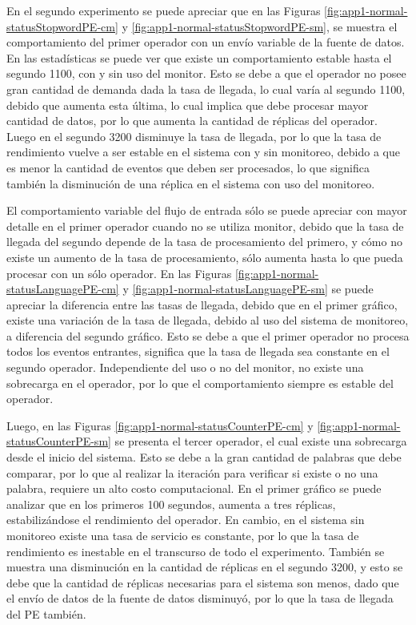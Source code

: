 En el segundo experimento se puede apreciar que en las Figuras \ref{fig:app1-normal-statusStopwordPE-cm} y \ref{fig:app1-normal-statusStopwordPE-sm}, se muestra el comportamiento del primer operador con un envío variable de la fuente de datos. En las estadísticas se puede ver que existe un comportamiento estable hasta el segundo 1100, con y sin uso del monitor. Esto se debe a que el operador no posee gran cantidad de demanda dada la tasa de llegada, lo cual varía al segundo 1100, debido que aumenta esta última, lo cual implica que debe procesar mayor cantidad de datos, por lo que aumenta la cantidad de réplicas del operador. Luego en el segundo 3200 disminuye la tasa de llegada, por lo que la tasa de rendimiento vuelve a ser estable en el sistema con y sin monitoreo, debido a que es menor la cantidad de eventos que deben ser procesados, lo que significa también la disminución de una réplica en el sistema con uso del monitoreo.

El comportamiento variable del flujo de entrada sólo se puede apreciar con mayor detalle en el primer operador cuando no se utiliza monitor, debido que la tasa de llegada del segundo depende de la tasa de procesamiento del primero, y cómo no existe un aumento de la tasa de procesamiento, sólo aumenta hasta lo que pueda procesar con un sólo operador. En las Figuras \ref{fig:app1-normal-statusLanguagePE-cm} y \ref{fig:app1-normal-statusLanguagePE-sm} se puede apreciar la diferencia entre las tasas de llegada, debido que en el primer gráfico, existe una variación de la tasa de llegada, debido al uso del sistema de monitoreo, a diferencia del segundo gráfico. Esto se debe a que el primer operador no procesa todos los eventos entrantes, significa que la tasa de llegada sea constante en el segundo operador. Independiente del uso o no del monitor, no existe una sobrecarga en el operador, por lo que el comportamiento siempre es estable del operador.

Luego, en las Figuras \ref{fig:app1-normal-statusCounterPE-cm} y \ref{fig:app1-normal-statusCounterPE-sm} se presenta el tercer operador, el cual existe una sobrecarga desde el inicio del sistema. Esto se debe a la gran cantidad de palabras que debe comparar, por lo que al realizar la iteración para verificar si existe o no una palabra, requiere un alto costo computacional. En el primer gráfico se puede analizar que en los primeros 100 segundos, aumenta a tres réplicas, estabilizándose el rendimiento del operador. En cambio, en el sistema sin monitoreo existe una tasa de servicio es constante, por lo que la tasa de rendimiento es inestable en el transcurso de todo el experimento. También se muestra una disminución en la cantidad de réplicas en el segundo 3200, y esto se debe que la cantidad de réplicas necesarias para el sistema son menos, dado que el envío de datos de la fuente de datos disminuyó, por lo que la tasa de llegada del PE también.

